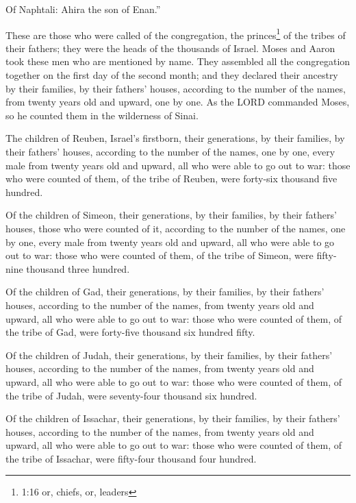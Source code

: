 \myverse{}Of Naphtali: Ahira the son of Enan.”


\myverse{}These are those who were called of the congregation, the princes\footnote{ 1:16 or, chiefs, or, leaders} of the tribes of their fathers; they were the heads of the thousands
of Israel.
\myverse{}Moses and Aaron took these men who are mentioned by name.
\myverse{}They assembled all the congregation together on the first day of the second
month; and they declared their ancestry by their families, by their fathers’ houses, according to the
number of the names, from twenty years old and upward, one by one.
\myverse{}As the LORD commanded Moses, so he counted them in the wilderness of Sinai.


\myverse{}The children of Reuben, Israel’s firstborn, their generations,
by their families, by their fathers’ houses, according to the number of the names, one by one, every male
from twenty years old and upward, all who were able to go out to war:
\myverse{}those who were counted of them, of the tribe of Reuben, were forty-six thousand
five hundred.


\myverse{}Of the children of Simeon, their generations, by their families,
by their fathers’ houses, those who were counted of it, according to the number of the names, one by one,
every male from twenty years old and upward, all who were able to go out to war:
\myverse{}those who were counted of them, of the tribe of Simeon, were fifty-nine thousand
three hundred.


\myverse{}Of the children of Gad, their generations, by their families,
by their fathers’ houses, according to the number of the names, from twenty years old and upward, all
who were able to go out to war:
\myverse{}those who were counted of them, of the tribe of Gad, were forty-five thousand
six hundred fifty.


\myverse{}Of the children of Judah, their generations, by their families,
by their fathers’ houses, according to the number of the names, from twenty years old and upward, all
who were able to go out to war:
\myverse{}those who were counted of them, of the tribe of Judah, were seventy-four thousand
six hundred.


\myverse{}Of the children of Issachar, their generations, by their families,
by their fathers’ houses, according to the number of the names, from twenty years old and upward, all
who were able to go out to war:
\myverse{}those who were counted of them, of the tribe of Issachar, were fifty-four
thousand four hundred.


